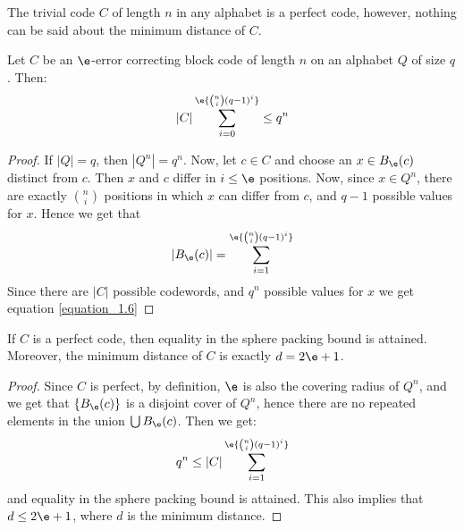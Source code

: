 \begin{example}\label{example_1.3}
  The trivial code $C$ of length $n$ in any alphabet is a perfect code, however,
  nothing can be said about the minimum distance of $C$.
\end{example}

\begin{theorem}\label{theorem_1.1.4}
  Let $C$ be an $\e$-error correcting block code of length $n$ on an alphabet
  $Q$ of size  $q$. Then:
  \begin{equation}\label{equation_1.6}
    |C|\sum_{i=0}^\e{{n \choose i}(q-1)^i} \leq q^n
  \end{equation}
\end{theorem}
\begin{proof}
  If $|Q|=q$, then $|Q^n|=q^n$. Now, let $c \in C$ and choose an $x \in B_\e(c)$
  distinct from $c$. Then $x$ and $c$ differ in  $i \leq \e$ positions. Now,
  since $x \in Q^n$, there are exactly ${n \choose i}$ positions in which $x$
  can differ from $c$, and $q-1$ possible values for $x$. Hence we get that
  \begin{equation*}
    |B_\e(c)|=\sum_{i=1}^\e{ {n \choose i}(q-1)^i }
  \end{equation*}
  Since there are $|C|$ possible codewords, and $q^n$ possible values for $x$ we
  get equation \ref{equation_1.6}
\end{proof}
\begin{corollary}
  If $C$ is a perfect code, then equality in the sphere packing bound is
  attained. Moreover, the minimum distance of $C$ is exactly $d=2\e+1$.
\end{corollary}
\begin{proof}
  Since $C$ is perfect, by definition, $\e$ is also the covering radius of
  $Q^n$, and we get that $\{B_\e(c)\}$ is a disjoint cover of $Q^n$, hence there
  are no repeated elements in the union $\bigcup{B_\e(c)}$. Then we get:
  \begin{equation*}
    q^n \leq |C|\sum_{i=1}^\e{ {n \choose i}(q-1)^i }
  \end{equation*}
  and equality in the sphere packing bound is attained. This also implies that
  $d \leq 2\e+1$, where $d$ is the minimum distance.
\end{proof}
